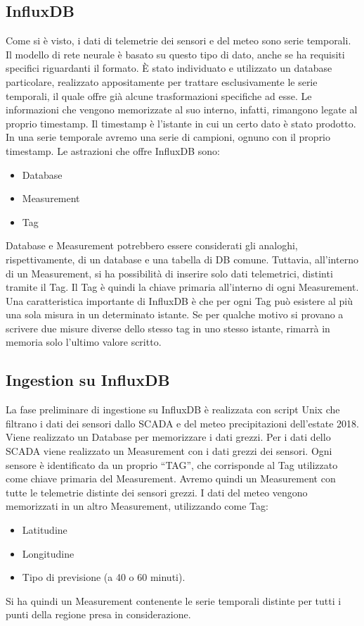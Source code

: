 \subsection{InfluxDB}\label{influx}
Come si è visto, i dati di telemetrie dei sensori e del meteo sono serie temporali. Il modello di rete neurale è basato su questo tipo di dato, anche se ha requisiti specifici riguardanti il formato. È stato individuato e utilizzato un database particolare, realizzato appositamente per trattare esclusivamente le serie temporali, il quale offre già alcune trasformazioni specifiche ad esse. Le informazioni che vengono memorizzate al suo interno, infatti, rimangono legate al proprio timestamp. Il timestamp è l’istante in cui un certo dato è stato prodotto. In una serie temporale avremo una serie di campioni, ognuno con il proprio timestamp. 
Le astrazioni che offre InfluxDB sono:
\begin{itemize}
	\item Database
	\item Measurement
	\item Tag
\end{itemize}
Database e Measurement potrebbero essere considerati gli analoghi, rispettivamente, di un database e una tabella di DB comune. Tuttavia, all’interno di un Measurement, si ha possibilità di inserire solo dati telemetrici, distinti tramite il Tag. Il Tag è quindi la chiave primaria all’interno di ogni Measurement. Una caratteristica importante di InfluxDB è che per ogni Tag può esistere al più una sola misura in un determinato istante. Se per qualche motivo si provano a scrivere due misure diverse dello stesso tag in uno stesso istante, rimarrà in memoria solo l’ultimo valore scritto.
\subsection{Ingestion su InfluxDB}
La fase preliminare di ingestione su InfluxDB è realizzata con script Unix che filtrano i dati dei sensori dallo SCADA e del meteo precipitazioni dell’estate 2018. Viene realizzato un Database per memorizzare i dati grezzi. Per i dati dello SCADA viene realizzato un Measurement con i dati grezzi dei sensori. Ogni sensore è identificato da un proprio “TAG”, che corrisponde al Tag utilizzato come chiave primaria del Measurement. Avremo quindi un Measurement con tutte le telemetrie distinte dei sensori grezzi. I dati del meteo vengono memorizzati in un altro Measurement, utilizzando come Tag:
\begin{itemize}
	\item Latitudine
	\item Longitudine
	\item Tipo di previsione (a 40 o 60 minuti).
\end{itemize} Si ha quindi un Measurement contenente le serie temporali distinte per tutti i punti della regione presa in considerazione.
